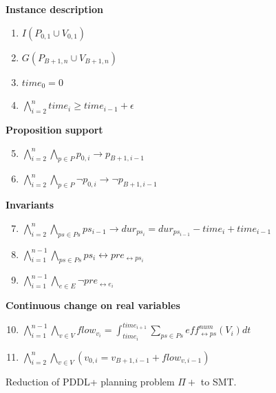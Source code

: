 \begin{figure}[thb]
\begin{minipage}[t]{0.39\linewidth}
\textbf{Instance description}
\begin{enumerate}[label=P\arabic*.]
  \item $I(P_{0,1}\cup V_{0,1})$
  \item $G(P_{B+1,n}\cup V_{B+1,n})$
  \item $time_0 = 0$
  \item $\bigwedge_{i=2}^n time_i \geq time_{i-1}+\epsilon$
\end{enumerate}
\textbf{Proposition support}
\begin{enumerate}[label=P\arabic*.]\setcounter{enumi}{4}
  \item $\bigwedge_{i=2}^n \bigwedge_{p\in P} p_{0,i} \rightarrow p_{B+1,i-1}$
  \item $\bigwedge_{i=2}^n \bigwedge_{p\in P} \neg p_{0,i} \rightarrow \neg p_{B+1,i-1}$
\end{enumerate}
\end{minipage}
\begin{minipage}[t]{0.6\linewidth}
\textbf{Invariants}
\begin{enumerate}[label=P\arabic*.]\setcounter{enumi}{6}
  \item $\bigwedge_{i=2}^n \bigwedge_{ps\in Ps} ps_{i-1} \rightarrow dur_{ps_i} = dur_{ps_{i-1}} - time_i + time_{i-1}$
  \item $\bigwedge_{i=1}^{n-1} \bigwedge_{ps \in Ps}  ps_i \leftrightarrow pre_{\leftrightarrow ps_i}$
  \item $\bigwedge_{i=1}^{n-1} \bigwedge_{e\in E} \neg pre_{\leftrightarrow e_i}$
\end{enumerate}
\textbf{Continuous change on real variables}
\begin{enumerate}[label=P\arabic*.]\setcounter{enumi}{9}
  \item $\bigwedge_{i=1}^{n-1} \bigwedge_{v\in V} flow_{v_i} = \int^{time_{i+1}}_{time_i} \sum_{ps\in Ps} eff^{num}_{\leftrightarrow ps}(V_i)dt$
  \item $\bigwedge_{i=2}^n \bigwedge_{v\in V} (v_{0,i} = v_{B+1,i-1} + flow_{v,i-1})$
\end{enumerate}
\end{minipage}
\caption{Reduction of PDDL+ planning problem $\Pi+$ to SMT.}
\label{eq:plan}
\end{figure}

